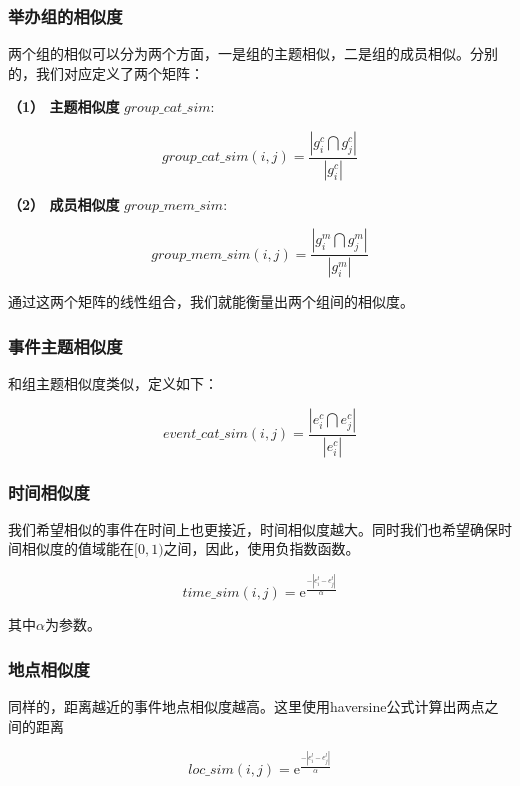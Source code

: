 \subsubsection{举办组的相似度}
两个组的相似可以分为两个方面，一是组的主题相似，二是组的成员相似。分别的，我们对应定义了两个矩阵：

\textbf{（1） 主题相似度} \(group\_cat\_sim:\)

\begin{equation}
group\_cat\_sim(i,j)=\frac{|g_i^c\bigcap g_j^c|}{|g_i^c|}
\end{equation}


\textbf{（2） 成员相似度} \(group\_mem\_sim:\)

\begin{equation}
group\_mem\_sim(i,j)=\frac{|g_i^m\bigcap g_j^m|}{|g_i^m|}
\end{equation}

通过这两个矩阵的线性组合，我们就能衡量出两个组间的相似度。

\subsubsection{事件主题相似度}

和组主题相似度类似，定义如下：

\begin{equation}
event\_cat\_sim(i,j)=\frac{|e_i^c\bigcap e_j^c|}{|e_i^c|}
\end{equation}

\subsubsection{时间相似度}

我们希望相似的事件在时间上也更接近，时间相似度越大。同时我们也希望确保时间相似度的值域能在\([0,1)\)之间，因此，使用负指数函数。

\begin{equation}   
time\_sim(i,j)=\mathrm{e}^\frac{-|e_i^t-e_j^t|}{\alpha}
\end{equation}

其中\(\alpha\)为参数。

\subsubsection{地点相似度}

同样的，距离越近的事件地点相似度越高。这里使用haversine公式计算出两点之间的距离

\begin{equation}   
loc\_sim(i,j)=\mathrm{e}^\frac{-|e_i^l-e_j^l|}{\alpha}
\end{equation}

